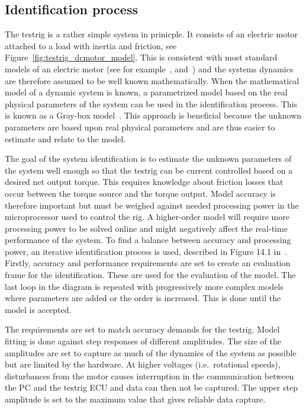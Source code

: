 \subsection{Identification process}
The testrig is a rather simple system in prinicple. It consists of an electric
motor attached to a load with inertia and friction, see
Figure~\ref{fig:testrig_dcmotor_model}.  This is consistent with most standard
models of an electric motor (see for example~\cite{beloiu2014},
\cite{reglerteknik2006} and~\cite{modeling1994}) and the systems dynamics are
therefore assumed to be well known mathematically. When the mathematical model
of a dynamic system is known, a parametrized model based on the real
physical parameters of the system can be used in the identification process.
This is known as a Gray-box model~\cite{modeling1994}. This approach is
beneficial because the unknown parameters are based upon real physical
parameters and are thus easier to estimate and relate to the model. 

The goal of the system identification is to estimate the unknown parameters of the
system well enough so that the testrig can be current controlled based on a 
desired net output torque. This requires knowledge about friction losses that
occur between the torque source and the torque output. Model accuracy is therefore
important but must be weighed against needed processing power in the microprocessor
used to control the rig. A higher-order model will require more processing power
to be solved online and might negatively affect the real-time performance of the
system. To find a balance between accuracy and processing power, an iterative
identification process is used, described in Figure 14.1 in~\cite{modeling1994}. 
Firstly, accuracy and performance requirements are set to create an evaluation
frame for the identification. These are used for the evaluation of the model. 
The last loop in the diagram is repeated with progressively more complex models
where parameters are added or the order is increased. This is done until the
model is accepted.

The requirements are set to match accuracy demands for the testrig. Model fitting
is done against step responses of different amplitudes. The size of the amplitudes
are set to capture as much of the dynamics of the system as possible but are limited
by the hardware. At higher voltages (i.e.\ rotational speeds), disturbances from the
motor causes interruption in the communication between the PC and the testrig
ECU and data can then not be captured. The upper step amplitude is set to the 
maximum value that gives reliable data capture. 

